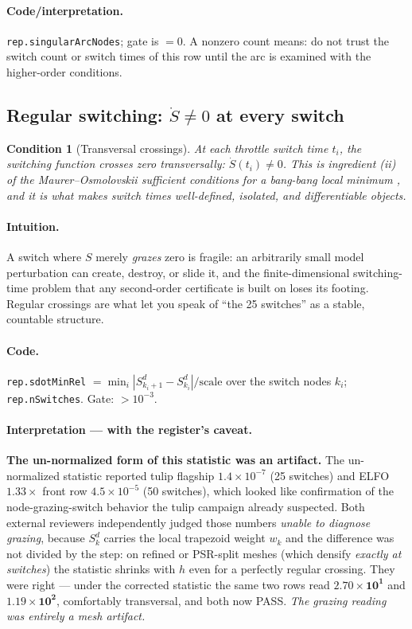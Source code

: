 \documentclass[11pt]{article}
\newcommand{\code}[1]{\texttt{#1}}
\newtheorem{condition}{Condition}
\begin{document}
\paragraph{Code/interpretation.}
\code{rep.singularArcNodes}; gate is $=0$. A nonzero count means: do not trust
the switch count or switch times of this row until the arc is examined with
the higher-order conditions.

\subsection{Regular switching: $\dot S\neq 0$ at every switch}
\label{sec:sdot}

\begin{condition}[Transversal crossings]
At each throttle switch time $t_i$, the switching function crosses zero
transversally: $\dot S(t_i)\neq 0$. This is ingredient (ii) of the
Maurer--Osmolovskii sufficient conditions for a bang-bang local minimum
\cite{OsmolovskiiMaurer2012}, and it is what makes switch times well-defined,
isolated, and differentiable objects.
\end{condition}

\paragraph{Intuition.}
A switch where $S$ merely \emph{grazes} zero is fragile: an arbitrarily small
model perturbation can create, destroy, or slide it, and the finite-dimensional
switching-time problem that any second-order certificate is built on loses its
footing. Regular crossings are what let you speak of ``the 25 switches'' as a
stable, countable structure.

\paragraph{Code.}
\code{rep.sdotMinRel} $=\min_i |S^d_{k_i+1}-S^d_{k_i}| / \mathrm{scale}$ over
the switch nodes $k_i$; \code{rep.nSwitches}. Gate: $>10^{-3}$.

\paragraph{Interpretation --- with the register's caveat.}
\textbf{The un-normalized form of this statistic was an artifact.} The
un-normalized statistic reported tulip flagship $1.4\times10^{-7}$ (25
switches) and ELFO $1.33\times$ front row $4.5\times10^{-5}$ (50 switches),
which looked like confirmation of the node-grazing-switch behavior the tulip
campaign already suspected. Both external reviewers independently judged those
numbers \emph{unable to diagnose grazing}, because $S^d_k$ carries the local
trapezoid weight $w_k$ and the difference was not divided by the step: on
refined or PSR-split meshes (which densify \emph{exactly at switches}) the
statistic shrinks with $h$ even for a perfectly regular crossing. They were
right --- under the corrected statistic the same two rows read
$\mathbf{2.70\times10^{1}}$ and $\mathbf{1.19\times10^{2}}$, comfortably
transversal, and both now PASS. \emph{The grazing reading was entirely a mesh
artifact.}
\end{document}

